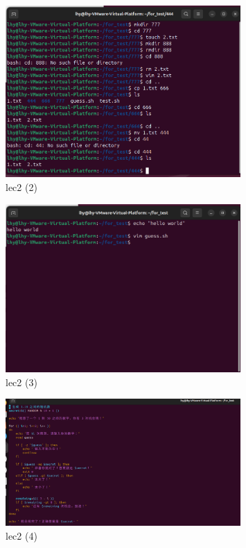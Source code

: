 \documentclass[a4paper, 12pt]{article}
\begin{document}
\begin{figure}[htbp]
    \centering
    \includegraphics[width=0.8\textwidth]{lec2 (2).png}
    \caption{lec2 (2)}
    \label{fig:lec2-2}
\end{figure}

\begin{figure}[htbp]
    \centering
    \includegraphics[width=0.8\textwidth]{lec2 (3).png}
    \caption{lec2 (3)}
    \label{fig:lec2-3}
\end{figure}

\begin{figure}[htbp]
    \centering
    \includegraphics[width=0.8\textwidth]{lec2 (4).png}
    \caption{lec2 (4)}
    \label{fig:lec2-4}
\end{figure}
\end{document}
